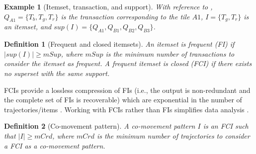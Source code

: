 \documentclass[
]{ceurart}
\newtheorem{example}{Example}
\newtheorem{definition}{Definition}
\begin{document}
\begin{example}[Itemset, transaction, and support]
With reference to , $Q_{A1}=\{T_b,T_g,T_r\}$ is the transaction corresponding to the tile $A1$, $I=\{T_g,T_r\}$ is an itemset, and $sup(I) = \{Q_{A1}, Q_{B1}, Q_{B2}, Q_{B3}\}$.
\end{example}

\begin{definition}[Frequent and closed itemsets]\label{def:fci}
An itemset is \textit{frequent} (FI) if $|sup(I)|\geq mSup$, where $mSup$ is the minimum number of transactions to consider the itemset as frequent.
A frequent itemset is \textit{closed} (FCI) if there exists no superset with the same support. 
\end{definition}

FCIs provide a lossless compression of FIs \citep{DBLP:conf/dmkd/PeiHM00} (i.e., the output is non-redundant and the complete set of FIs is recoverable) which are exponential in the number of trajectories/items \citep{DBLP:conf/vldb/AgrawalS94}. 
Working with FCIs rather than FIs simplifies data analysis \citep{DBLP:journals/isci/FranciaGR20}.

\begin{definition}[Co-movement pattern]\label{def:comov}
A \textit{co-movement pattern} $I$ is an FCI such that $|I| \ge mCrd$, where $mCrd$ is the minimum number of trajectories to consider a FCI as a co-movement pattern.
\end{definition}
\end{document}
